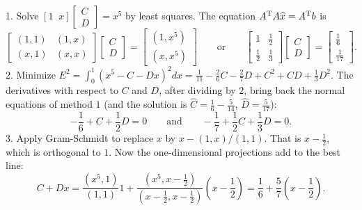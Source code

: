 1. Solve \([1\;\;x]\left[\begin{smallmatrix}C\\ D\end{smallmatrix}\right]=x^{5}\) by least squares. The equation \(A^{\mbox{\scriptsize T}}A\widehat{x}=A^{\mbox{\scriptsize T}}b\) is \[\begin{bmatrix}(1,1)&(1,x)\\ (x,1)&(x,x)\end{bmatrix}\begin{bmatrix}C\\ D\end{bmatrix}=\begin{bmatrix}(1,x^{5})\\ (x,x^{5})\end{bmatrix}\qquad\mbox{or}\qquad\begin{bmatrix}1&\frac{1}{2}\\ \frac{1}{2}&\frac{1}{3}\end{bmatrix}\begin{bmatrix}C\\ D\end{bmatrix}=\begin{bmatrix}\frac{1}{6}\\ \frac{1}{17}\end{bmatrix}.\]
2. Minimize \(E^{2}=\int_{0}^{1}(x^{5}-C-Dx)^{2}dx=\frac{1}{11}-\frac{2}{6}C-\frac{2}{7}D+ C^{2}+CD+\frac{1}{3}D^{2}\). The derivatives with respect to \(C\) and \(D\), after dividing by \(2\), bring back the normal equations of method \(1\) (and the solution is \(\widehat{C}=\frac{1}{6}-\frac{5}{14}\), \(\widehat{D}=\frac{5}{17}\)): \[-\frac{1}{6}+C+\frac{1}{2}D=0\qquad\mbox{and}\qquad-\frac{1}{7}+\frac{1}{2}C+ \frac{1}{3}D=0.\]
3. Apply Gram-Schmidt to replace \(x\) by \(x-(1,x)/(1,1)\). That is \(x-\frac{1}{2}\), which is orthogonal to \(1\). Now the one-dimensional projections add to the best line: \[C+Dx=\frac{(x^{5},1)}{(1,1)}1+\frac{(x^{5},x-\frac{1}{2})}{(x-\frac{1}{2},x- \frac{1}{2})}(x-\frac{1}{2})=\frac{1}{6}+\frac{5}{7}\left(x-\frac{1}{2}\right).\] 